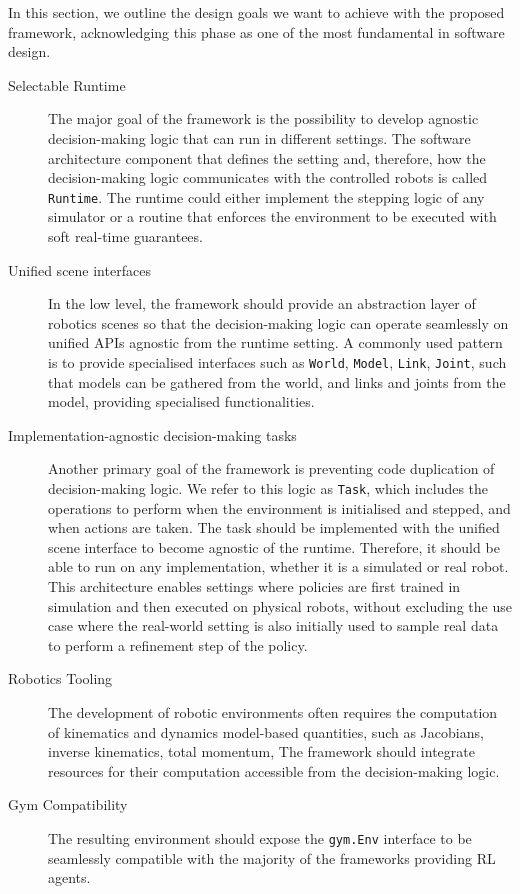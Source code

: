 In this section, we outline the design goals we want to achieve with the proposed framework, acknowledging this phase as one of the most fundamental in software design.

\begin{description}
%
\item[Selectable Runtime]
The major goal of the framework is the possibility to develop agnostic decision-making logic that can run in different settings.
The software architecture component that defines the setting and, therefore, how the decision-making logic communicates with the controlled robots is called \verb|Runtime|.
The runtime could either implement the stepping logic of any simulator or a routine that enforces the environment to be executed with soft real-time guarantees.
%
\item[Unified scene interfaces]
In the low level, the framework should provide an abstraction layer of robotics scenes so that the decision-making logic can operate seamlessly on unified \acp{API} agnostic from the runtime setting.
A commonly used pattern is to provide specialised interfaces such as \verb|World|, \verb|Model|, \verb|Link|, \verb|Joint|, \etc such that models can be gathered from the world, and links and joints from the model, providing specialised functionalities.
%
\item[Implementation-agnostic decision-making tasks]
Another primary goal of the framework is preventing code duplication of decision-making logic.
We refer to this logic as \verb|Task|, which includes the operations to perform when the environment is initialised and stepped, and when actions are taken.
The task should be implemented with the unified scene interface to become agnostic of the runtime.
Therefore, it should be able to run on any implementation, whether it is a simulated or real robot.
This architecture enables settings where policies are first trained in simulation and then executed on physical robots, without excluding the use case where the real-world setting is also initially used to sample real data to perform a refinement step of the policy.
%
\item[Robotics Tooling]
The development of robotic environments often requires the computation of kinematics and dynamics model-based quantities, such as Jacobians, inverse kinematics, total momentum, \etc The framework should integrate resources for their computation accessible from the decision-making logic.
%
\item[Gym Compatibility]
The resulting environment should expose the \verb|gym.Env| interface to be seamlessly compatible with the majority of the frameworks providing \ac{RL} agents.
%
\end{description}

